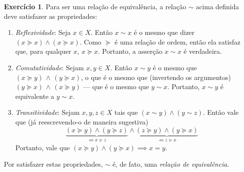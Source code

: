 \documentclass[12pt]{article}
\numberwithin{equation}{section}
\theoremstyle{plain}
\theoremstyle{definition}
\newtheorem{exercise}{Exercício}
\theoremstyle{remark}
\newcommand{\pref}{\succeq}
\begin{document}
\begin{exercise}
      Para ser uma relação de equivalência, a relação \(\sim\) acima definida deve satisfazer as propriedades: 
    \begin{enumerate}
      \item \emph{Reflexividade}: Seja $x \in X$. Então $x \sim x$ é o mesmo que dizer $(x \succeq x) \land (x \succeq x)$. Como $\succeq$ é uma relação de ordem, então ela satisfaz que, para qualquer $x$, $x \succeq x$. Portanto, a asserção $x \sim x$ é verdadeira.
      
      \item \emph{Comutatividade}: Sejam $x, y \in X$. Então $x \sim y$ é o mesmo que $(x \succeq y)\,  \land  \, (y \succeq x)$, o que é o mesmo que (invertendo os argumentos) $(y \succeq x)\,  \land  \, (x \succeq y)$ --- que é o mesmo que $y \sim x$. Portanto, $x \sim y$ é equivalente a $y \sim x$.
      
      \item \emph{Transitividade}: Sejam \( x, y, z \in X\) tais que \((x \sim y) \land (y \sim z)\). Então vale que (já reescrevendo-o de maneira sugestiva)
      \[
      \underbrace{ (x \succeq y) \land  (y \succeq z) }_{ \iff x \succeq z } \land \underbrace{ (z \succeq y) \land (y \succeq x) }_{ \iff z \succeq x }
      \]
      Portanto, vale que $(x\pref y) \land (y \pref x) \implies x = y$.
    \end{enumerate}
  
    Por satisfazer estas propriedades, \(\sim\) é, de fato, uma \emph{relação de equivalência}.

\end{exercise}
\end{document}
